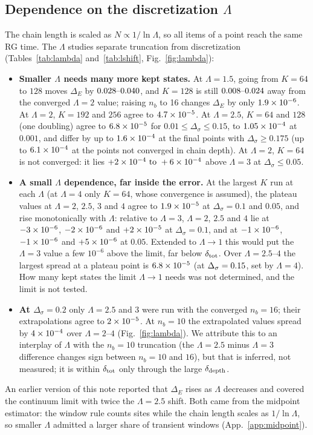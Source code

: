 \documentclass[10pt,a4paper]{article}
\newcommand{\Ds}{\Delta_\sigma}
\newcommand{\DE}{\Delta_E}
\newcommand{\dd}{\delta_{\rm depth}}
\newcommand{\dtot}{\delta_{\rm tot}}
\begin{document}
\subsection{Dependence on the discretization \texorpdfstring{$\Lambda$}{Lambda}}\label{sec:lambda}
The chain length is scaled as $N\propto1/\ln\Lambda$, so all items of a point reach the same RG time. The $\Lambda$ studies separate
truncation from discretization (Tables~\ref{tab:lambda} and~\ref{tab:lshift}, Fig.~\ref{fig:lambda}):
\begin{itemize}
\item \textbf{Smaller $\Lambda$ needs many more kept states.} At $\Lambda=1.5$, going from $K=64$ to $128$ moves $\DE$ by
  $0.028\text{--}0.040$, and $K=128$ is still $0.008\text{--}0.024$ away from the converged $\Lambda=2$ value; raising $n_b$ to 16 changes
  $\DE$ by only $1.9\times10^{-6}$. At $\Lambda=2$, $K=192$ and $256$ agree to $4.7\times10^{-5}$. At $\Lambda=2.5$, $K=64$ and $128$ (one
  doubling) agree to $6.8\times10^{-5}$ for $0.01\le\Ds\le0.15$, to $1.05\times10^{-4}$ at $0.001$, and differ by up to $1.6\times10^{-4}$
  at the final points with $\Ds\ge0.175$ (up to $6.1\times10^{-4}$ at the points not converged in chain depth). At $\Lambda=2$, $K=64$ is not converged: it lies $+2\times10^{-4}\text{ to }+6\times10^{-4}$ above $\Lambda=3$ at $\Ds\le0.05$.
\item \textbf{A small $\Lambda$ dependence, far inside the error.} At the largest $K$ run at each $\Lambda$ (at $\Lambda=4$ only
  $K=64$, whose convergence is assumed), the plateau values at $\Lambda=2$, $2.5$, $3$ and $4$ agree to $1.9\times10^{-5}$ at $\Ds=0.1$ and $0.05$, and rise monotonically with $\Lambda$: relative to $\Lambda=3$, $\Lambda=2$,
  $2.5$ and $4$ lie at $-3\times10^{-6}$, $-2\times10^{-6}$ and $+2\times10^{-5}$ at $\Ds=0.1$, and at $-1\times10^{-6}$,
  $-1\times10^{-6}$ and $+5\times10^{-6}$ at $0.05$. Extended to $\Lambda\to1$ this would put the $\Lambda=3$ value a few $10^{-6}$ above
  the limit, far below $\dtot$. Over $\Lambda=2.5$--$4$ the largest spread at a plateau point is $6.8\times10^{-5}$ (at
  $\Ds=\nrgLspreadMaxAt$, set by $\Lambda=4$). How many kept states the limit $\Lambda\to1$ needs was not determined, and the limit
  is not tested.
\item \textbf{At $\Ds=0.2$} only $\Lambda=2.5$ and $3$ were run with the converged $n_b=16$; their extrapolations agree to
  $2\times10^{-5}$. At $n_b=10$ the extrapolated values spread by $4\times10^{-4}$ over $\Lambda=2$--$4$
  (Fig.~\ref{fig:lambda}). We attribute this to an interplay of $\Lambda$ with the $n_b=10$ truncation (the $\Lambda=2.5$ minus
  $\Lambda=3$ difference changes sign between $n_b=10$ and $16$), but that is inferred, not measured; it is within $\dtot$ only through
  the large $\dd$.
\end{itemize}
An earlier version of this note reported that $\DE$ rises as $\Lambda$ decreases and covered the continuum limit with twice the
$\Lambda=2.5$ shift. Both came from the midpoint estimator: the window rule counts sites while the chain length scales as
$1/\ln\Lambda$, so smaller $\Lambda$ admitted a larger share of transient windows (App.~\ref{app:midpoint}).
\end{document}
